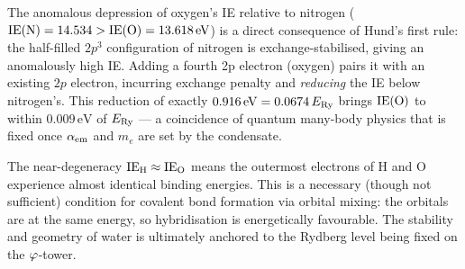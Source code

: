 \begin{remark}
\label{P11:rem:hund_HO_coincidence}
The anomalous depression of oxygen's IE relative to nitrogen
($\mathrm{IE}(\mathrm{N}) = 14.534 > \mathrm{IE}(\mathrm{O}) = 13.618\,\mathrm{eV}$)
is a direct consequence of Hund's first rule: the half-filled $2p^3$
configuration of nitrogen is exchange-stabilised, giving an anomalously
high IE.  Adding a fourth 2p electron (oxygen) pairs it with an
existing $2p$ electron, incurring exchange penalty and
\emph{reducing} the IE below nitrogen's.
This reduction of exactly $0.916\,\mathrm{eV} = 0.0674\,E_{\mathrm{Ry}}$ brings
$\mathrm{IE}(\mathrm{O})$ to within $0.009\,\mathrm{eV}$ of $E_{\mathrm{Ry}}$
--- a coincidence of quantum many-body physics that is fixed once
$\alpha_{\mathrm{em}}$ and $m_e$ are set by the condensate.
\end{remark}

\begin{remark}
\label{P11:rem:why_water_forms}
The near-degeneracy $\mathrm{IE}_\mathrm{H} \approx \mathrm{IE}_\mathrm{O}$ means the
outermost electrons of H and O experience almost identical
binding energies.  This is a necessary (though not sufficient)
condition for covalent bond formation via orbital mixing:
the orbitals are at the same energy, so hybridisation
is energetically favourable.  The stability and geometry of
water is ultimately anchored to the Rydberg level being fixed
on the $\varphi$-tower.
\end{remark}

